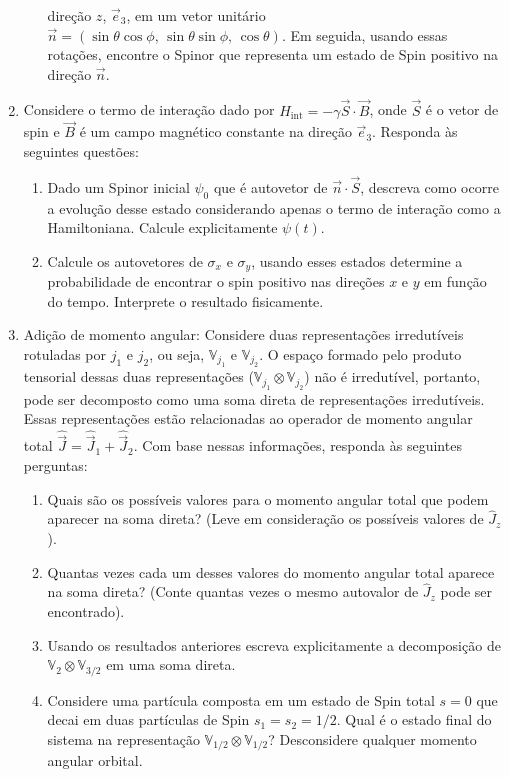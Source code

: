 \begin{enumerate}
\begin{enumerate}
		            direção $z$, $\vec{e}_3$, em um vetor unitário $\vec{n} =
			            (\sin\theta\cos\phi,\, \sin\theta\sin\phi,\, \cos\theta)$. Em seguida,
		            usando essas rotações, encontre o Spinor que representa um estado de Spin
		            positivo na direção $\vec{n}$.
	      \end{enumerate}
	\item Considere o termo de interação dado por $H_\mathrm{int} = -\gamma
		      \vec{S}\cdot\vec{B}$, onde $\vec{S}$ é o vetor de spin e $\vec{B}$ é um campo
	      magnético constante na direção $\vec{e}_3$. Responda às seguintes questões:
	      \begin{enumerate}
		      \item Dado um Spinor inicial $\psi_0$ que é autovetor de
		            $\vec{n}\cdot\vec{S}$, descreva como ocorre a evolução desse estado
		            considerando apenas o termo de interação como a Hamiltoniana. Calcule
		            explicitamente $\psi(t)$.
		      \item Calcule os autovetores de $\sigma_x$ e $\sigma_y$, usando esses
		            estados determine a probabilidade de encontrar o spin positivo nas
		            direções $x$ e $y$ em função do tempo. Interprete o resultado fisicamente.
	      \end{enumerate}
	\item Adição de momento angular: Considere duas representações irredutíveis
	      rotuladas por $j_1$ e $j_2$, ou seja, $\mathbb{V}_{j_1}$ e $\mathbb{V}_{j_2}$. O
	      espaço formado pelo produto tensorial dessas duas representações
	      ($\mathbb{V}_{j_1}\otimes\mathbb{V}_{j_2}$) não é irredutível, portanto, pode ser
	      decomposto como uma soma direta de representações irredutíveis. Essas representações
	      estão relacionadas ao operador de momento angular total $\hat{\vec{J}} =
		      \hat{\vec{J}}_1 + \hat{\vec{J}}_2$. Com base nessas informações, responda às
	      seguintes perguntas:
	      \begin{enumerate}
		      \item Quais são os possíveis valores para o momento angular total que
		            podem aparecer na soma direta? (Leve em consideração os possíveis valores
		            de $\hat{J}_z$).
		      \item Quantas vezes cada um desses valores do momento angular total
		            aparece na soma direta? (Conte quantas vezes o mesmo autovalor de
		            $\hat{J}_z$ pode ser encontrado).
		      \item Usando os resultados anteriores escreva explicitamente a
		            decomposição de $\mathbb{V}_{2}\otimes\mathbb{V}_{3/2}$ em uma soma
		            direta.
		      \item Considere uma partícula composta em um estado de Spin total $s=0$
		            que decai em duas partículas de Spin $s_1=s_2=1/2$. Qual é o estado final
		            do sistema na representação $\mathbb{V}_{1/2}\otimes\mathbb{V}_{1/2}$?
		            Desconsidere qualquer momento angular orbital.
	      \end{enumerate}
\end{enumerate}


